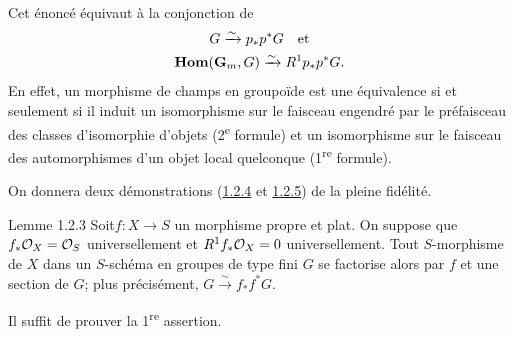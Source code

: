 \documentclass[10pt]{../fichiers-configuration-latex/smfart}
\begin{document}
\setcounter{subsubsection}{2}
\paragraph{}

Cet énoncé équivaut à la conjonction de
\begin{gather*}
G\xrightarrow{\sim} p_{\ast}p^{\ast}G\quad\mbox{\rm et}\\
\operatorname{\mathbf{Hom}}(\mathbf{G}_{m},G)\xrightarrow{\sim} R^{1}p_{\ast}p^{\ast}G{}.
\end{gather*}
En effet, un morphisme de champs en groupoïde est une équivalence si
et seulement si il induit un isomorphisme sur le faisceau engendré par
le préfaisceau des classes d'isomorphie d'objets (2\textsuperscript{e} formule) et un
isomorphisme sur le faisceau des automorphismes d'un objet local
quelconque (1\textsuperscript{re} formule).

On donnera deux démonstrations (\hyperref[XVIII.lem1.2.4]{1.2.4} et
\hyperref[XVIII.subsubsec1.2.5]{1.2.5}) de la pleine fidélité.

\begin{enonce*}{Lemme 1.2.3}
Soit\pageoriginale $f:X\rightarrow S$ un morphisme propre et plat. On
suppose que $f_{\ast}{\mathcal O}_{X}={\mathcal O}_{S}$ universellement et
$R^{1}f_{\ast}{\mathcal O}_{X}=0$ universellement. Tout $S$-morphisme de $X$
dans un $S$-schéma en groupes de type fini $G$ se factorise alors par
$f$ et une section de $G$; plus précisément, $G\xrightarrow{\sim}
f_{\ast}f^{\ast}G$.
\end{enonce*}

Il suffit de prouver la 1\textsuperscript{re} assertion.
\end{document}
